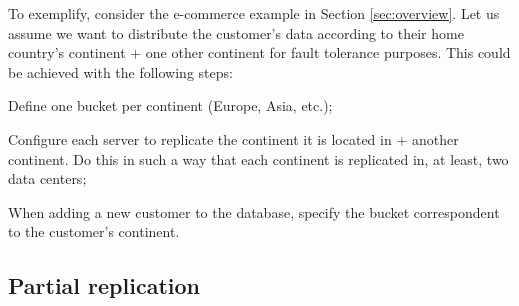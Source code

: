 \documentclass[sigplan,10pt]{acmart}
\begin{document}
To exemplify, consider the e-commerce example in Section \ref{sec:overview}.
Let us assume we want to distribute the customer's data according to their home country's continent + one other continent for fault tolerance purposes.
This could be achieved with the following steps:

\begin{compactenum}
	\item Define one bucket per continent (Europe, Asia, etc.);
	\item Configure each server to replicate the continent it is located in + another continent. Do this in such a way that each continent is replicated in, at least, two data centers;
	\item When adding a new customer to the database, specify the bucket correspondent to the customer's continent.
\end{compactenum}

\subsection{Partial replication}
\label{subsec:partial}

\end{document}
